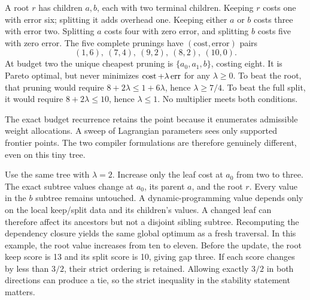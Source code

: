 A root $r$ has children $a,b$, each with two terminal children. Keeping $r$ costs one with error six; splitting it adds overhead one. Keeping either $a$ or $b$ costs three with error two. Splitting $a$ costs four with zero error, and splitting $b$ costs five with zero error.
The five complete prunings have $(\text{cost},\text{error})$ pairs
\[
(1,6),\ (7,4),\ (9,2),\ (8,2),\ (10,0).
\]
At budget two the unique cheapest pruning is $\{a_0,a_1,b\}$, costing eight. It is Pareto optimal, but never minimizes $\operatorname{cost}+\lambda\operatorname{err}$ for any $\lambda\ge0$.
To beat the root, that pruning would require $8+2\lambda\le1+6\lambda$, hence $\lambda\ge7/4$. To beat the full split, it would require $8+2\lambda\le10$, hence $\lambda\le1$. No multiplier meets both conditions.

The exact budget recurrence retains the point because it enumerates admissible weight allocations. A sweep of Lagrangian parameters sees only supported frontier points. The two compiler formulations are therefore genuinely different, even on this tiny tree.

Use the same tree with $\lambda=2$. Increase only the leaf cost at $a_0$ from two to three. The exact subtree values change at $a_0$, its parent $a$, and the root $r$. Every value in the $b$ subtree remains untouched.
A dynamic-programming value depends only on the local keep/split data and its children's values. A changed leaf can therefore affect its ancestors but not a disjoint sibling subtree. Recomputing the dependency closure yields the same global optimum as a fresh traversal. In this example, the root value increases from ten to eleven.
Before the update, the root keep score is 13 and its split score is 10, giving gap three. If each score changes by less than $3/2$, their strict ordering is retained. Allowing exactly $3/2$ in both directions can produce a tie, so the strict inequality in the stability statement matters.

